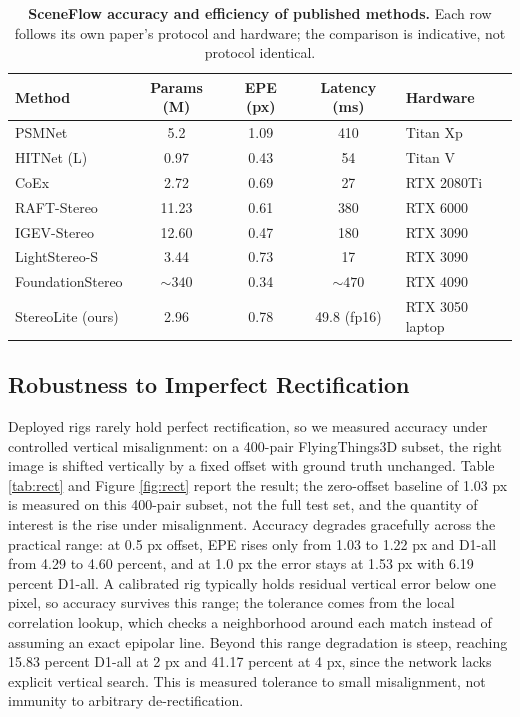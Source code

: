 \documentclass[conference]{IEEEtran}
\begin{document}
\begin{table}[!htbp]
\centering
\caption{\textbf{SceneFlow accuracy and efficiency of published methods.} Each row follows its own paper's protocol and hardware; the comparison is indicative, not protocol identical.}
\label{tab:sceneflow}
\scriptsize
\setlength{\tabcolsep}{3pt}
\begin{tabular}{lcccl}
\toprule
Method & Params (M) & EPE (px) & Latency (ms) & Hardware\\
\midrule
PSMNet \cite{chang2018psmnet} & 5.2 & 1.09 & 410 & Titan Xp\\
HITNet (L) \cite{tankovich2021hitnet} & 0.97 & 0.43 & 54 & Titan V\\
CoEx \cite{bangunharcana2021coex} & 2.72 & 0.69 & 27 & RTX 2080Ti\\
RAFT-Stereo \cite{lipson2021raftstereo} & 11.23 & 0.61 & 380 & RTX 6000\\
IGEV-Stereo \cite{xu2023igev} & 12.60 & 0.47 & 180 & RTX 3090\\
LightStereo-S \cite{guo2025lightstereo} & 3.44 & 0.73 & 17 & RTX 3090\\
FoundationStereo \cite{wen2025foundationstereo} & ${\sim}340$ & 0.34 & ${\sim}470$ & RTX 4090\\
\midrule
StereoLite (ours) & 2.96 & 0.78 & 49.8 (fp16) & RTX 3050 laptop\\
\bottomrule
\end{tabular}
\end{table}

\subsection{Robustness to Imperfect Rectification}
Deployed rigs rarely hold perfect rectification, so we measured accuracy under controlled vertical misalignment: on a 400-pair FlyingThings3D subset, the right image is shifted vertically by a fixed offset with ground truth unchanged. Table \ref{tab:rect} and Figure \ref{fig:rect} report the result; the zero-offset baseline of 1.03 px is measured on this 400-pair subset, not the full test set, and the quantity of interest is the rise under misalignment. Accuracy degrades gracefully across the practical range: at 0.5 px offset, EPE rises only from 1.03 to 1.22 px and D1-all from 4.29 to 4.60 percent, and at 1.0 px the error stays at 1.53 px with 6.19 percent D1-all. A calibrated rig typically holds residual vertical error below one pixel, so accuracy survives this range; the tolerance comes from the local correlation lookup, which checks a neighborhood around each match instead of assuming an exact epipolar line. Beyond this range degradation is steep, reaching 15.83 percent D1-all at 2 px and 41.17 percent at 4 px, since the network lacks explicit vertical search. This is measured tolerance to small misalignment, not immunity to arbitrary de-rectification.
\end{document}

